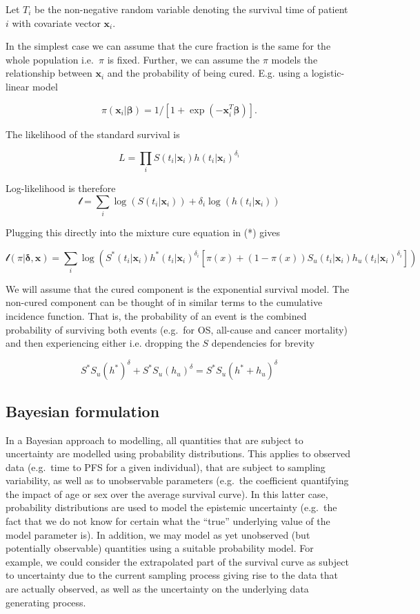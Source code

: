\documentclass[
]{article}
\begin{document}
Let \(T_i\) be the non-negative random variable denoting the survival
time of patient \(i\) with covariate vector \(\boldsymbol{x}_i\).

In the simplest case we can assume that the cure fraction is the same
for the whole population i.e.~\(\pi\) is fixed. Further, we can assume
the \(\pi\) models the relationship between \(\boldsymbol{x}_i\) and the
probability of being cured. E.g. using a logistic-linear model

\[
\pi(\boldsymbol{x}_i | \boldsymbol{\beta}) = 1/[1 + \exp(-\boldsymbol{x}_i^T \boldsymbol{\beta})].
\]

The likelihood of the standard survival is

\[
L = \prod_i S(t_i | \boldsymbol{x}_i) h(t_i | \boldsymbol{x}_i)^{\delta_i}
\]

Log-likelihood is therefore \[
\mathcal{l} = \sum_i \log(S(t_i | \boldsymbol{x}_i)) + \delta_i \log(h(t_i | \boldsymbol{x}_i))
\]

Plugging this directly into the mixture cure equation in (*) gives

\[
\mathcal{l}(\pi | \boldsymbol{\delta}, \boldsymbol{x}) =
 \sum_i \log(S^*(t_i | \boldsymbol{x}_i) h^*(t_i | \boldsymbol{x}_i)^{\delta_i}[\pi(x) +
   (1 − \pi(x)) S_u(t_i | \boldsymbol{x}_i) h_u(t_i | \boldsymbol{x}_i)^{\delta_i}])
\]

We will assume that the cured component is the exponential survival
model. The non-cured component can be thought of in similar terms to the
cumulative incidence function. That is, the probability of an event is
the combined probability of surviving both events (e.g.~for OS,
all-cause and cancer mortality) and then experiencing either i.e.
dropping the \(S\) dependencies for brevity

\begin{equation}
\tag{**}
S^* S_u (h^*)^{\delta} + S^* S_u (h_u)^{\delta} = S^* S_u (h^* + h_u)^{\delta}
\end{equation}

\hypertarget{bayesian-formulation}{%
\subsection{Bayesian formulation}\label{bayesian-formulation}}

In a Bayesian approach to modelling, all quantities that are subject to
uncertainty are modelled using probability distributions. This applies
to observed data (e.g.~time to PFS for a given individual), that are
subject to sampling variability, as well as to unobservable parameters
(e.g.~the coefficient quantifying the impact of age or sex over the
average survival curve). In this latter case, probability distributions
are used to model the epistemic uncertainty (e.g.~the fact that we do
not know for certain what the ``true'' underlying value of the model
parameter is). In addition, we may model as yet unobserved (but
potentially observable) quantities using a suitable probability model.
For example, we could consider the extrapolated part of the survival
curve as subject to uncertainty due to the current sampling process
giving rise to the data that are actually observed, as well as the
uncertainty on the underlying data generating process.
\end{document}
